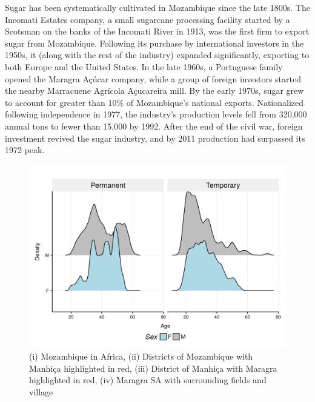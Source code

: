 \documentclass[]{article}
\begin{document}
Sugar has been systematically cultivated in Mozambique since the late
1800s. The Incomati Estates company, a small sugarcane processing
facility started by a Scotsman on the banks of the Incomati River in
1913, was the first firm to export sugar from Mozambique. Following its
purchase by international investors in the 1950s, it (along with the
rest of the industry) expanded significantly, exporting to both Europe
and the United States. In the late 1960s, a Portuguese family opened the
Maragra Açúcar company, while a group of foreign investors started the
nearby Marracuene Agrícola Açucareira mill. By the early 1970s, sugar
grew to account for greater than 10\% of Mozambique's national exports.
Nationalized following independence in 1977, the industry's production
levels fell from 320,000 annual tons to fewer than 15,000 by 1992. After
the end of the civil war, foreign investment revived the sugar industry,
and by 2011 production had surpassed its 1972 peak.

\begin{figure}[h]

{\centering \includegraphics{figures/unnamed-chunk-13-1} 

}

\caption{(i) Mozambique in Africa, (ii) Districts of Mozambique with Manhiça highlighted in red, (iii) District of Manhiça with Maragra highlighted in red, (iv) Maragra SA with surrounding fields and village}\label{fig:unnamed-chunk-13}
\end{figure}
\end{document}
